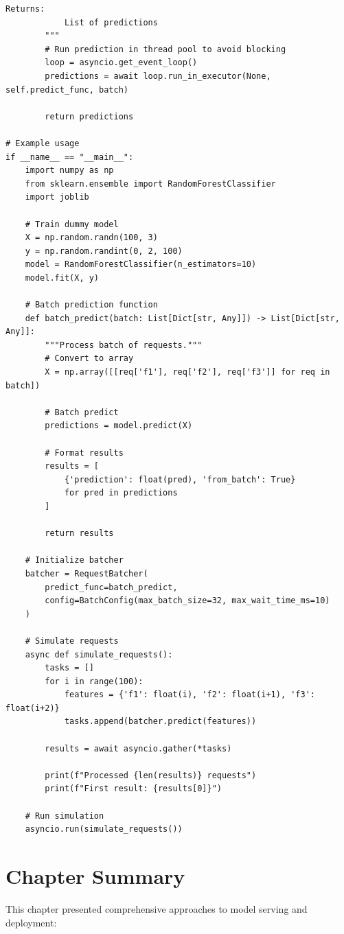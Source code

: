\begin{lstlisting}[style=python, caption={Dynamic Request Batching}]
        Returns:
            List of predictions
        """
        # Run prediction in thread pool to avoid blocking
        loop = asyncio.get_event_loop()
        predictions = await loop.run_in_executor(None, self.predict_func, batch)

        return predictions

# Example usage
if __name__ == "__main__":
    import numpy as np
    from sklearn.ensemble import RandomForestClassifier
    import joblib

    # Train dummy model
    X = np.random.randn(100, 3)
    y = np.random.randint(0, 2, 100)
    model = RandomForestClassifier(n_estimators=10)
    model.fit(X, y)

    # Batch prediction function
    def batch_predict(batch: List[Dict[str, Any]]) -> List[Dict[str, Any]]:
        """Process batch of requests."""
        # Convert to array
        X = np.array([[req['f1'], req['f2'], req['f3']] for req in batch])

        # Batch predict
        predictions = model.predict(X)

        # Format results
        results = [
            {'prediction': float(pred), 'from_batch': True}
            for pred in predictions
        ]

        return results

    # Initialize batcher
    batcher = RequestBatcher(
        predict_func=batch_predict,
        config=BatchConfig(max_batch_size=32, max_wait_time_ms=10)
    )

    # Simulate requests
    async def simulate_requests():
        tasks = []
        for i in range(100):
            features = {'f1': float(i), 'f2': float(i+1), 'f3': float(i+2)}
            tasks.append(batcher.predict(features))

        results = await asyncio.gather(*tasks)

        print(f"Processed {len(results)} requests")
        print(f"First result: {results[0]}")

    # Run simulation
    asyncio.run(simulate_requests())
\end{lstlisting}

\section{Chapter Summary}

This chapter presented comprehensive approaches to model serving and deployment:


